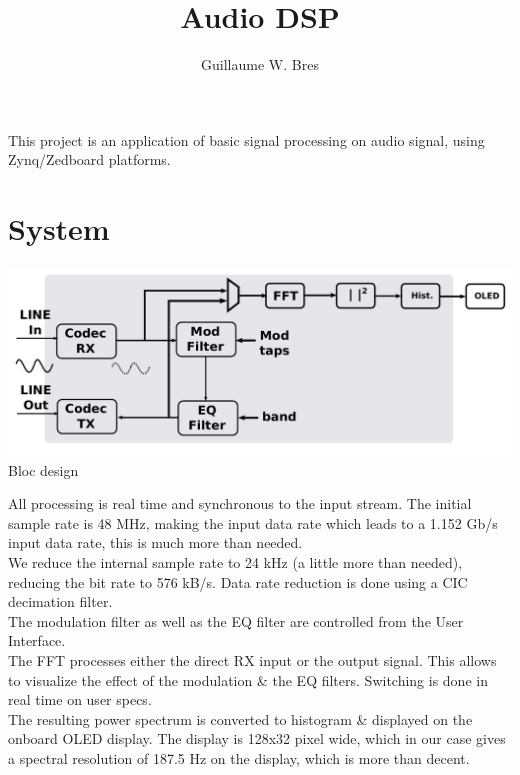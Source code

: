 \documentclass{article}
\author{Guillaume W. Bres}
\title{Audio DSP}
\begin{document}
\maketitle

This project is an application of basic
signal processing on audio signal,
using Zynq/Zedboard platforms.

\tableofcontents

\newpage
\section{System}


\begin{center}
	\includegraphics[width=0.75\linewidth]{bloc_design.pdf} \\
	Bloc design
\end{center}

All processing is real time and synchronous to the input
stream. The initial sample rate is 48 MHz, making the
input data rate 
which leads to a 1.152 Gb/s input data rate, this is much more than needed. \\

We reduce the internal sample rate to 24 kHz (a little more than needed),
reducing the bit rate to 576 kB/s.
Data rate reduction is done using a CIC decimation filter. \\

The modulation filter as well as the
EQ filter are controlled from the User Interface. \\

The FFT processes either the
direct RX input or the output signal.
This allows to visualize the effect
of the modulation \& the EQ filters.
Switching is done in real time on user specs. \\

The resulting power spectrum is converted to histogram
\& displayed on the onboard OLED display.
The display is 128x32 pixel wide, which in our case
gives a spectral resolution of 187.5 Hz
on the display, which is more than decent. \\
\end{document}

